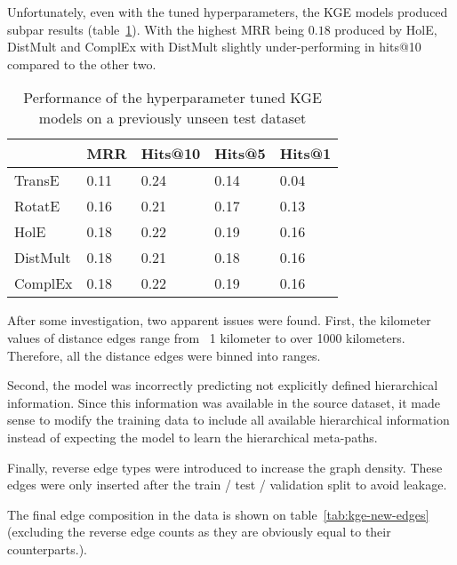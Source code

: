 Unfortunately, even with the tuned hyperparameters, the KGE models produced subpar results (table~\ref{tab:kge-res}).
With the highest MRR being $0.18$ produced by HolE, DistMult and ComplEx with DistMult slightly under-performing in
hits@10 compared to the other two.
\begin{table}[!ht]
    \centering
    \begin{tabular}{|l|l|l|l|l|}
        \hline
         & MRR & Hits@10 &  Hits@5 &  Hits@1 \\ \hline
        TransE & 0.11   & 0.24 & 0.14 & 0.04 \\ \hline
        RotatE & 0.16   & 0.21 & 0.17 & 0.13 \\ \hline
        HolE & 0.18     &  0.22 & 0.19 & 0.16 \\ \hline
        DistMult & 0.18 & 0.21 & 0.18 & 0.16 \\ \hline
        ComplEx & 0.18  & 0.22 & 0.19 & 0.16 \\ \hline
    \end{tabular}
    \caption{Performance of the hyperparameter tuned KGE models on a previously unseen test dataset}
    \label{tab:kge-res}
\end{table}

After some investigation, two apparent issues were found.
First, the kilometer values of distance edges range from ~1 kilometer to over 1000 kilometers.
Therefore, all the distance edges were binned into ranges.

Second, the model was incorrectly predicting not explicitly defined hierarchical information.
Since this information was available in the source dataset, it made sense to modify the training data
to include all available hierarchical information instead of expecting the model to learn the hierarchical meta-paths.

Finally, reverse edge types were introduced to increase the graph density.
These edges were only inserted after the train / test / validation split to avoid leakage.

The final edge composition in the data is shown on table~\ref{tab:kge-new-edges} (excluding the reverse edge counts
as they are obviously equal to their counterparts.).

